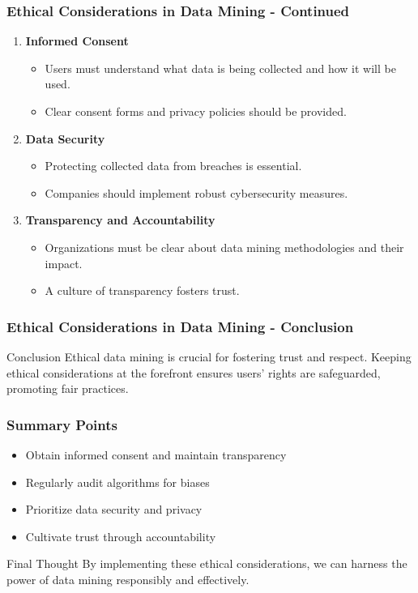 \documentclass[aspectratio=169]{beamer}
\begin{document}
\begin{frame}[fragile]
    \frametitle{Ethical Considerations in Data Mining - Continued}
    \begin{enumerate}[resume]
        \item \textbf{Informed Consent}
            \begin{itemize}
                \item Users must understand what data is being collected and how it will be used.
                \item Clear consent forms and privacy policies should be provided.
            \end{itemize}
        \item \textbf{Data Security}
            \begin{itemize}
                \item Protecting collected data from breaches is essential.
                \item Companies should implement robust cybersecurity measures.
            \end{itemize}
        \item \textbf{Transparency and Accountability}
            \begin{itemize}
                \item Organizations must be clear about data mining methodologies and their impact.
                \item A culture of transparency fosters trust.
            \end{itemize}
    \end{enumerate}
\end{frame}

\begin{frame}[fragile]
    \frametitle{Ethical Considerations in Data Mining - Conclusion}
    \begin{block}{Conclusion}
        Ethical data mining is crucial for fostering trust and respect. Keeping ethical considerations at the forefront ensures users' rights are safeguarded, promoting fair practices.
    \end{block}
\end{frame}

\begin{frame}[fragile]
    \frametitle{Summary Points}
    \begin{itemize}
        \item Obtain informed consent and maintain transparency
        \item Regularly audit algorithms for biases
        \item Prioritize data security and privacy
        \item Cultivate trust through accountability
    \end{itemize}
    \begin{block}{Final Thought}
        By implementing these ethical considerations, we can harness the power of data mining responsibly and effectively.
    \end{block}
\end{frame}
\end{document}
